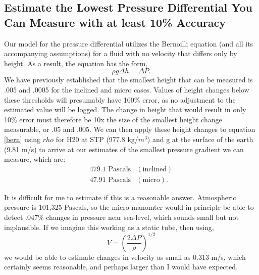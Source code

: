 \documentclass{article}
\begin{document}
\subsection{Estimate the Lowest Pressure Differential You Can Measure
  with at least 10\% Accuracy}

Our model for the pressure differential utilizes the Bernoilli equation
(and all its accompanying assumptions) for a fluid with no velocity that
differs only by height. As a result, the equation has the form,
\begin{equation}
 \rho g \Delta h = \Delta P. 
 \label{bern}
\end{equation}
We have previously established that the smallest height that can be
measured is .005 and .0005 for the inclined and micro cases. Values of
height changes below these thresholds will presumably have 100\% error,
as no adjustment to the estimated value will be logged. The change in
height that would result in only 10\% error must therefore be 10x the
size of the smallest height change measurable, or .05 and .005. We can
then apply these height changes to equation \ref{bern} using $rho$ for
H20 at STP (977.8 kg/$m^3$) and g at the surface of the earth (9.81 m/s)
to arrive at our estimates of the smallest pressure gradient we can
measure, which are: 
\begin{eqnarray}
 479.1 \text{ Pascals} & (\text{inclined}) \\
 47.91 \text{ Pascals} & (\text{micro}). 
\end{eqnarray}

It is difficult for me to estimate if this is a reasonable
answer. Atmospheric pressure is 101,325 Pascals, so the micro-manomter would in
principle be able to detect .047\% changes in pressure near sea-level, which sounds
small but not implausible. If we imagine this working as a static tube,
then using,
\begin{equation}
V = \left(\frac{2 \Delta P}{\rho}\right)^{1/2}
\end{equation}
we would be able to estimate changes in velocity as small as 0.313 m/s,
which certainly seems reasonable, and perhaps larger than I would have
expected. 
\end{document}
